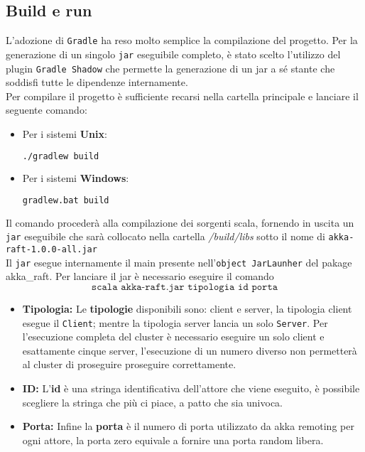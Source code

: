  	\subsection{Build e run}
	 	L'adozione di \texttt{Gradle} ha reso molto semplice la compilazione del progetto.
	 	Per la generazione di un singolo \texttt{jar} eseguibile completo, è stato scelto l'utilizzo del plugin \texttt{Gradle Shadow} \cite{GradleShadowSite} che permette la generazione di un jar a sé stante che soddisfi tutte le dipendenze internamente.\\
	 	Per compilare il progetto è sufficiente recarsi nella cartella principale e lanciare il seguente comando:
	 	\begin{itemize}
	 		\item Per i sistemi \textbf{Unix}: 
	 			\begin{lstlisting}[language=bash]
./gradlew build
	 			\end{lstlisting}
	 		\item Per i sistemi \textbf{Windows}: 
	 			\begin{lstlisting}[language=bash]
gradlew.bat build
	 			\end{lstlisting} 
	 	\end{itemize}
		Il comando procederà alla compilazione dei sorgenti scala, fornendo in uscita un \texttt{jar} eseguibile che sarà collocato nella cartella \emph{/build/libs} sotto il nome di \texttt{akka-raft-1.0.0-all.jar}\\
		Il \texttt{jar} esegue internamente il main presente nell'\texttt{object JarLaunher} del pakage akka\_raft.
	  Per lanciare il jar è necessario eseguire il comando
    \[
      \texttt{scala akka-raft.jar tipologia id porta}
    \]
    \begin{itemize}
      \item{\textbf{Tipologia:}}
      Le \textbf{tipologie} disponibili sono: client e server, la tipologia client esegue il \texttt{Client};
      mentre la tipologia server lancia un solo \texttt{Server}.
      Per l'esecuzione completa del cluster è necessario eseguire un solo client e esattamente cinque server, l'esecuzione di un numero diverso non permetterà al cluster di proseguire proseguire correttamente.
      \item{\textbf{ID:}}
      L'\textbf{id} è una stringa identificativa dell'attore che viene eseguito, è possibile scegliere la stringa che più ci piace, a patto che sia univoca.
      \item{\textbf{Porta:}}
      Infine la \textbf{porta} è il numero di porta utilizzato da akka remoting per ogni attore, la porta zero equivale a fornire una porta random libera.
    \end{itemize}
